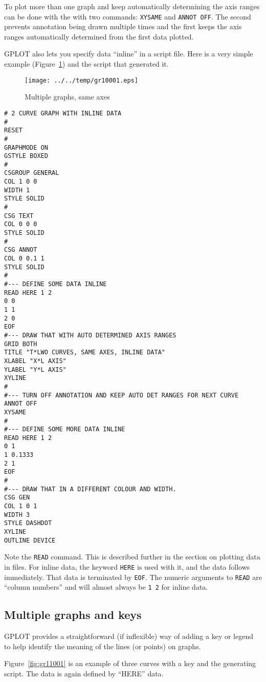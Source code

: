 \documentclass[a4paper,twoside,11pt]{article}
\makeatletter
\def\maxwidth{%
  \ifdim\Gin@nat@width>\linewidth
    \linewidth
  \else
    \Gin@nat@width
  \fi
}
\newcommand{\newpara}{\par\vspace{4mm}\noindent}
\makeatother
\begin{document}
\newpara
To plot more than one graph and keep automatically determining the axis
ranges can be done with the with two commands: \texttt{XYSAME} and
\texttt{ANNOT\ OFF}. The second prevents annotation being drawn multiple
times and the first keeps the axis ranges automatically determined from
the first data plotted.

\newpara
GPLOT also lets you specify data ``inline'' in a script file. Here is a
very simple example (Figure~\ref{fig:gr10001}) and the script that generated it.

\begin{figure}
  \centering
  \texttt{[image: ../../temp/gr10001.eps]}
  \caption{Multiple graphs, same axes}
  \label{fig:gr10001}
\end{figure}

\begin{lstlisting}
# 2 CURVE GRAPH WITH INLINE DATA
#
RESET
#
GRAPHMODE ON
GSTYLE BOXED
#
CSGROUP GENERAL
COL 1 0 0
WIDTH 1
STYLE SOLID
#
CSG TEXT
COL 0 0 0
STYLE SOLID
#
CSG ANNOT
COL 0 0.1 1
STYLE SOLID
#
#--- DEFINE SOME DATA INLINE 
READ HERE 1 2
0 0
1 1
2 0
EOF
#--- DRAW THAT WITH AUTO DETERMINED AXIS RANGES
GRID BOTH
TITLE "T*LWO CURVES, SAME AXES, INLINE DATA"
XLABEL "X*L AXIS"
YLABEL "Y*L AXIS"
XYLINE
#
#--- TURN OFF ANNOTATION AND KEEP AUTO DET RANGES FOR NEXT CURVE
ANNOT OFF 
XYSAME
#
#--- DEFINE SOME MORE DATA INLINE
READ HERE 1 2
0 1
1 0.1333
2 1
EOF
#
#--- DRAW THAT IN A DIFFERENT COLOUR AND WIDTH.
CSG GEN
COL 1 0 1
WIDTH 3
STYLE DASHDOT
XYLINE
OUTLINE DEVICE
\end{lstlisting}

\newpara
Note the \texttt{READ} command. This is described further in the section
on plotting data in files. For inline data, the keyword \texttt{HERE} is
used with it, and the data follows immediately. That data is terminated
by \texttt{EOF}. The numeric arguments to \texttt{READ} are ``column
numbers'' and will almost always be \texttt{1\ 2} for inline data.

\subsection{Multiple graphs and keys}\label{multiple-graphs-and-keys}
\newpara
GPLOT provides a straightforward (if inflexible) way of adding a key or
legend to help identify the meaning of the lines (or points) on graphs.

\newpara
Figure~\ref{fig:gr11001} is an example of three curves with a key and the generating script.
The data is again defined by ``HERE'' data.
\end{document}
